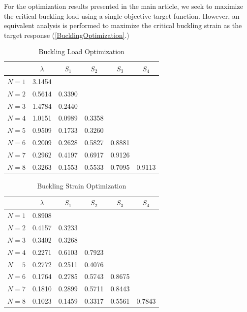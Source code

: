 \documentclass[10pt,twoside]{fernandes_supp}
\begin{document}
For the optimization results presented in the main article, we seek to maximize the critical buckling load using a single objective target function. However, an equivalent analysis is performed to maximize the critical buckling strain as the target response (\cref{BucklingOptimization}.) 

\begin{table}[!htb]
\centering
    \begin{tabular}{c||c|c|c|c|c}
          & $\lambda$ & $S_1$ &$S_2$ &$S_3$&$S_4$ \\ \hline\hline
         $N=1$ &  3.1454 &  &  &  &  \\ \hline
         $N=2$ &  0.5614 &  0.3390 &  &  &  \\ \hline
         $N=3$ &  1.4784 &  0.2440 &  &  &  \\ \hline
         $N=4$ &  1.0151 &  0.0989 &  0.3358 &  &  \\ \hline
         $N=5$ &  0.9509 &  0.1733 &  0.3260 &  &  \\ \hline
         $N=6$ &  0.2009 &  0.2628 &  0.5827 &  0.8881 &  \\ \hline
         $N=7$ &  0.2962 &  0.4197 &  0.6917 &  0.9126 &  \\ \hline
         $N=8$ &  0.3263 &  0.1553 &  0.5533 &  0.7095 &  0.9113 \\
    \end{tabular}
\caption{Buckling Load Optimization}
\label{table1}
\end{table}


\begin{table}[!htb]
\centering
    \begin{tabular}{c||c|c|c|c|c}
          & $\lambda$ & $S_1$ &$S_2$ &$S_3$&$S_4$ \\ \hline\hline
         $N=1$ &  0.8908 &  &  &  &  \\ \hline
         $N=2$ &  0.4157 &  0.3233 &  &  &  \\ \hline
         $N=3$ &  0.3402 &  0.3268 &  &  &  \\ \hline
         $N=4$ &  0.2271 &  0.6103 &  0.7923 &  &  \\ \hline
         $N=5$ &  0.2772 &  0.2511 &  0.4076 &  &  \\ \hline
         $N=6$ &  0.1764 &  0.2785 &  0.5743 &  0.8675 &  \\ \hline
         $N=7$ &  0.1810 &  0.2899 &  0.5711 &  0.8443 &  \\ \hline
         $N=8$ &  0.1023 &  0.1459 &  0.3317 &  0.5561 &  0.7843 \\
    \end{tabular}
\caption{Buckling Strain Optimization}
\label{table2}
\end{table}
\end{document}
